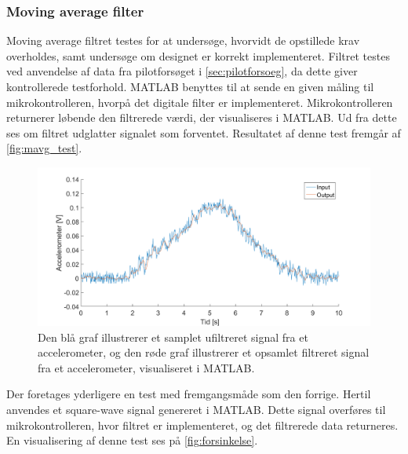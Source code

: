 \subsubsection{Moving average filter} \label{sec:mavg_test}
Moving average filtret testes for at undersøge, hvorvidt de opstillede krav overholdes, samt undersøge om designet er korrekt implementeret. 
Filtret testes ved anvendelse af data fra pilotforsøget i \autoref{sec:pilotforsoeg}, da dette giver kontrollerede testforhold. 
MATLAB benyttes til at sende en given måling til mikrokontrolleren, hvorpå det digitale filter er implementeret. 
Mikrokontrolleren returnerer løbende den filtrerede værdi, der visualiseres i MATLAB. 
Ud fra dette ses om filtret udglatter signalet som forventet. 
Resultatet af denne test fremgår af \autoref{fig:mavg_test}. 

\begin{figure}[H]
	\centering
	\includegraphics[width=1\textwidth]{figures/accelerometer_filter}
	\caption{Den blå graf illustrerer et samplet ufiltreret signal fra et accelerometer, og den røde graf illustrerer et opsamlet filtreret signal fra et accelerometer, visualiseret i MATLAB.}
	\label{fig:mavg_test}
\end{figure}

\noindent
Der foretages yderligere en test med fremgangsmåde som den forrige. 
Hertil anvendes et square-wave signal genereret i MATLAB. 
Dette signal overføres til mikrokontrolleren, hvor filtret er implementeret, og det filtrerede data returneres. 
En visualisering af denne test ses på \autoref{fig:forsinkelse}.


